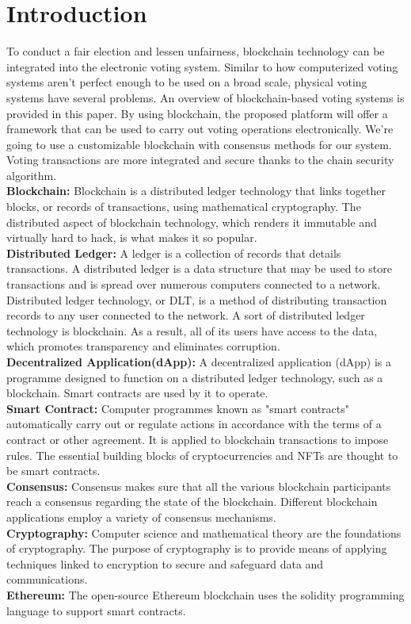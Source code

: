 \documentclass[10pt,final,journal,a4paper,oneside,twocolumn]{IEEEtran}
\begin{document}
	\section{Introduction}
		To conduct a fair election and lessen unfairness, blockchain technology can be integrated into the electronic voting system. Similar to how computerized voting systems aren't perfect enough to be used on a broad scale, physical voting systems have several problems. An overview of blockchain-based voting systems is provided in this paper. By using blockchain, the proposed platform will offer a framework that can be used to carry out voting operations electronically. We're going to use a customizable blockchain with consensus methods for our system. Voting transactions are more integrated and secure thanks to the chain security algorithm.
		\\\textbf{Blockchain:} Blockchain is a distributed ledger technology that links together blocks, or records of transactions, using mathematical cryptography. The distributed aspect of blockchain technology, which renders it immutable and virtually hard to hack, is what makes it so popular.
		\\\textbf{Distributed Ledger:} A ledger is a collection of records that details transactions. A distributed ledger is a data structure that may be used to store transactions and is spread over numerous computers connected to a network. Distributed ledger technology, or DLT, is a method of distributing transaction records to any user connected to the network. A sort of distributed ledger technology is blockchain. As a result, all of its users have access to the data, which promotes transparency and eliminates corruption.
		\\\textbf{Decentralized Application(dApp):} A decentralized application (dApp) is a programme designed to function on a distributed ledger technology, such as a blockchain. Smart contracts are used by it to operate.
		\\\textbf{Smart Contract:} Computer programmes known as "smart contracts" automatically carry out or regulate actions in accordance with the terms of a contract or other agreement. It is applied to blockchain transactions to impose rules. The essential building blocks of cryptocurrencies and NFTs are thought to be smart contracts.
		\\\textbf{Consensus:} Consensus makes sure that all the various blockchain participants reach a consensus regarding the state of the blockchain. Different blockchain applications employ a variety of consensus mechanisms.
		\\\textbf{Cryptography:} Computer science and mathematical theory are the foundations of cryptography. The purpose of cryptography is to provide means of applying techniques linked to encryption to secure and safeguard data and communications.
		\\\textbf{Ethereum:} The open-source Ethereum blockchain uses the solidity programming language to support smart contracts.
\end{document}
